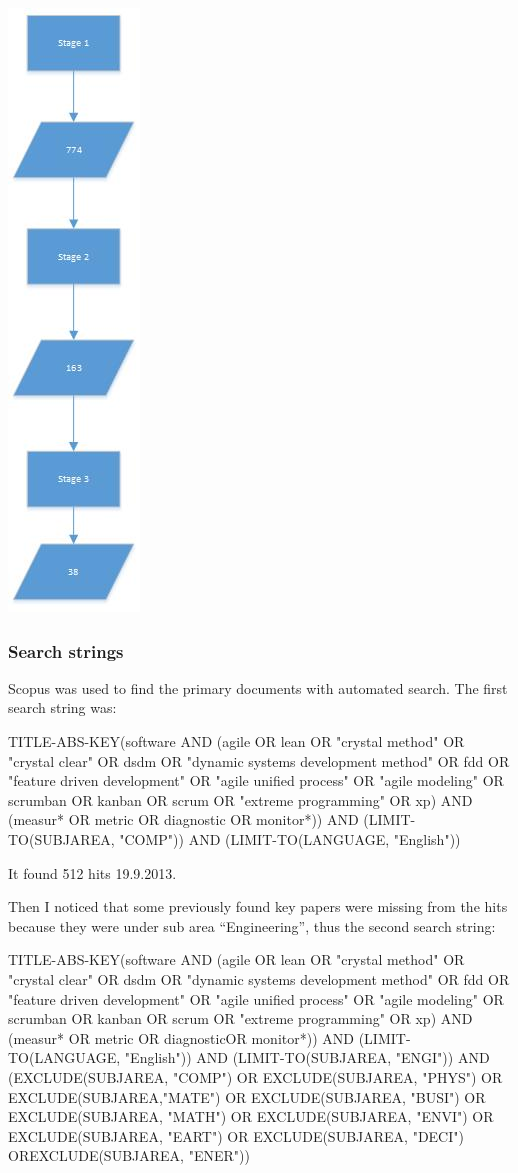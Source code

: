 \documentclass{sig-alternate}
\begin{document}
\includegraphics{SelectionFunnel.jpg}

\subsubsection{Search strings}
Scopus was used to find the primary documents with automated search. The first
search string was:

TITLE-ABS-KEY(software AND (agile OR lean OR "crystal method" OR "crystal
clear" OR dsdm OR "dynamic systems development method" OR fdd OR "feature
driven development" OR "agile unified process" OR "agile modeling" OR scrumban
OR kanban OR scrum OR "extreme programming" OR xp) AND (measur* OR metric OR
diagnostic OR monitor*)) AND (LIMIT-TO(SUBJAREA, "COMP")) AND
(LIMIT-TO(LANGUAGE, "English"))

It found 512 hits 19.9.2013.

Then I noticed that some previously found key papers were missing from the
hits because they were under sub area ``Engineering'', thus the second search
string:

TITLE-ABS-KEY(software AND (agile OR lean OR "crystal method" OR "crystal
clear" OR dsdm OR "dynamic systems development method" OR fdd OR "feature
driven development" OR "agile unified process" OR "agile modeling" OR scrumban
OR kanban OR scrum OR "extreme programming" OR xp) AND (measur* OR metric OR
diagnosticOR monitor*)) AND (LIMIT-TO(LANGUAGE, "English")) AND
(LIMIT-TO(SUBJAREA, "ENGI")) AND (EXCLUDE(SUBJAREA, "COMP") OR
EXCLUDE(SUBJAREA, "PHYS") OR EXCLUDE(SUBJAREA,"MATE") OR EXCLUDE(SUBJAREA,
"BUSI") OR EXCLUDE(SUBJAREA, "MATH") OR EXCLUDE(SUBJAREA, "ENVI") OR
EXCLUDE(SUBJAREA, "EART") OR EXCLUDE(SUBJAREA, "DECI") OREXCLUDE(SUBJAREA,
"ENER"))
\end{document}
